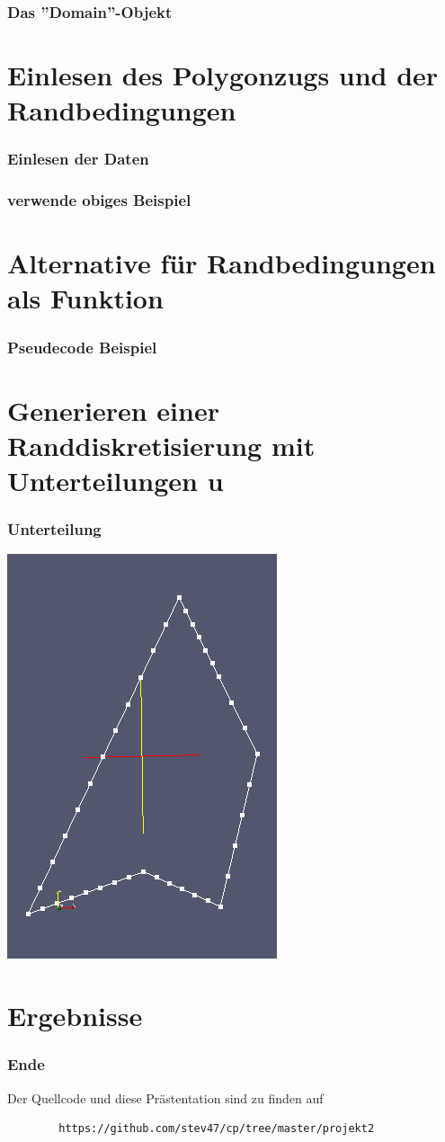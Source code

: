 \documentclass{beamer}
\begin{document}
\begin{frame}[fragile]
	\frametitle{Das ''Domain''-Objekt}
	
\end{frame}



\section{Einlesen des Polygonzugs und der Randbedingungen}

\begin{frame}[fragile]
	\frametitle{Einlesen der Daten}
	
\end{frame}

\begin{frame}
	\frametitle{verwende obiges Beispiel}
\end{frame}



\section{Alternative f\"ur Randbedingungen als Funktion}

\begin{frame}
	\frametitle{Pseudecode Beispiel}
	
\end{frame}



\section{Generieren einer Randdiskretisierung mit Unterteilungen u}

\begin{frame}
	\frametitle{Unterteilung}
	\includegraphics[scale=0.3]{snapshot2.png}
\end{frame}




\section{Ergebnisse}


\begin{frame}[fragile]
	\frametitle{Ende}
	Der Quellcode und diese Pr\"astentation sind zu finden auf
	\begin{verbatim}
		https://github.com/stev47/cp/tree/master/projekt2
	\end{verbatim}
\end{frame}
\end{document}
